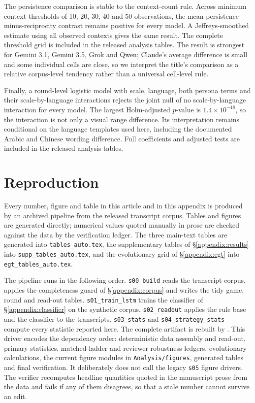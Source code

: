 \documentclass[11pt,a4paper]{article}
\begin{document}
The persistence comparison is stable to the context-count rule. Across minimum
context thresholds of 10, 20, 30, 40 and 50 observations, the mean
persistence-minus-reciprocity contrast remains positive for every model. A
Jeffreys-smoothed estimate using all observed contexts gives the same result.
The complete threshold grid is included in the released analysis tables. The result is strongest for
Gemini 3.1, Gemini 3.5, Grok and Qwen; Claude's average difference is small and
some individual cells are close, so we interpret the title's comparison as a
relative corpus-level tendency rather than a universal cell-level rule.

Finally, a round-level logistic model with scale, language, both persona terms
and their scale-by-language interactions rejects the joint null of no
scale-by-language interaction for every model. The largest Holm-adjusted
$p$-value is $1.4\times10^{-48}$, so the interaction is not only a visual
range difference. Its interpretation remains conditional on the language
templates used here, including the documented Arabic and Chinese wording
difference. Full coefficients and adjusted tests are included in the released
analysis tables.



\section{Reproduction}\label{appendix:repro}

Every number, figure and table in this article and in this appendix is produced
by an archived pipeline from the released transcript corpus. Tables and figures
are generated directly; numerical values quoted manually in prose are checked
against the data by the verification ledger. The three main-text tables are
generated into \texttt{tables\_auto.tex}, the supplementary tables of
\S\ref{appendix:results} into \texttt{supp\_tables\_auto.tex}, and the
evolutionary grid of \S\ref{appendix:egt} into \texttt{egt\_tables\_auto.tex}.

The pipeline runs in the following order. \texttt{s00\_build} reads the
transcript corpus, applies the completeness guard of
\S\ref{appendix:corpus} and writes the tidy game, round and read-out tables.
\texttt{s01\_train\_lstm} trains the classifier of \S\ref{appendix:classifier}
on the synthetic corpus. \texttt{s02\_readout} applies the rule base and the
classifier to the transcripts. \texttt{s03\_stats} and
\texttt{s04\_strategy\_stats} compute every statistic reported here.
The complete artifact is rebuilt by
. This driver encodes the
dependency order: deterministic data assembly and read-out, primary statistics,
matched-ladder and reviewer robustness ledgers, evolutionary calculations, the
current figure modules in \texttt{Analysis/figures}, generated tables and final
verification. It deliberately does not call the legacy \texttt{s05} figure
drivers. The verifier recomputes headline quantities quoted in the manuscript
prose from the data and fails if any of them disagrees, so that a stale number
cannot survive an edit.
\end{document}
